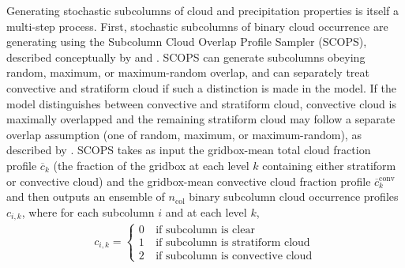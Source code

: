 Generating stochastic subcolumns of cloud and precipitation properties
is itself a multi-step process. First, stochastic subcolumns of binary
cloud occurrence are generating using the Subcolumn Cloud Overlap
Profile Sampler (SCOPS), described conceptually by
\citet{klein_and_jakob_1999} and \citet{webb_et_al_2001}. SCOPS can
generate subcolumns obeying random, maximum, or maximum-random overlap,
and can separately treat convective and stratiform cloud if such a
distinction is made in the model. If the model distinguishes between
convective and stratiform cloud, convective cloud is maximally
overlapped and the remaining stratiform cloud may follow a separate
overlap assumption (one of random, maximum, or maximum-random), as
described by \citet{webb_et_al_2001}. SCOPS takes as input the
gridbox-mean total cloud fraction profile \(\overline{c}_k\) (the
fraction of the gridbox at each level \(k\) containing either stratiform
or convective cloud) and the gridbox-mean convective cloud fraction
profile \(\overline{c}^\textrm{conv}_k\) and then outputs an ensemble of
\(n_\textrm{col}\) binary subcolumn cloud occurrence profiles
\(c_{i, k}\), where for each subcolumn \(i\) and at each level \(k\),
\[\begin{gathered} 
    c_{i, k} = \begin{cases} 
        0 & ~\text{if subcolumn is clear} \\ 
        1 & ~\text{if subcolumn is stratiform cloud} \\ 
        2 & ~\text{if subcolumn is convective cloud} 
    \end{cases}
\end{gathered}\]

